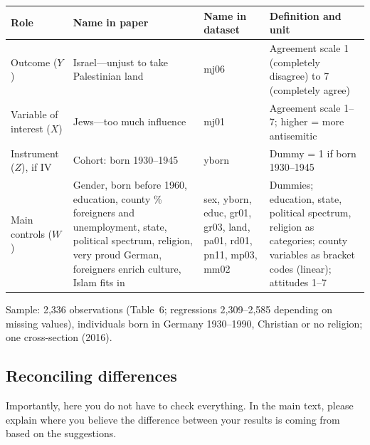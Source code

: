 \documentclass[12pt,a4paper]{article}
\renewcommand{\arraystretch}{1.25}
\begin{document}
{\renewcommand{\arraystretch}{1.4}%
\begin{tabularx}{\textwidth}{@{}>{\raggedright\arraybackslash}p{}
  >{\raggedright\arraybackslash}p{}
  >{\raggedright\arraybackslash}p{}
  L@{}}
\toprule
Role & Name in paper & Name in dataset & Definition and unit \\
\midrule
Outcome ($Y$) & Israel---unjust to take Palestinian land & mj06 & Agreement scale 1 (completely disagree) to 7 (completely agree) \\
Variable of interest ($X$) & Jews---too much influence & mj01 & Agreement scale 1--7; higher = more antisemitic \\
Instrument ($Z$), if IV & Cohort: born 1930--1945 & yborn & Dummy = 1 if born 1930--1945 \\
Main controls ($W$) & Gender, born before 1960, education, county \% foreigners and unemployment, state, political spectrum, religion, very proud German, foreigners enrich culture, Islam fits in & sex, yborn, educ, gr01, gr03, land, pa01, rd01, pn11, mp03, mm02 & Dummies; education, state, political spectrum, religion as categories; county variables as bracket codes (linear); attitudes 1--7 \\
\bottomrule
\end{tabularx}}

\medskip\noindent
Sample: 2,336 observations (Table~6; regressions 2,309--2,585 depending on missing values), individuals born in Germany 1930--1990, Christian or no religion; one cross-section (2016).

\subsection{Reconciling differences}

Importantly, here you do not have to check everything. In the main text, please explain where you believe the difference between your results is coming from based on the suggestions.
\end{document}
